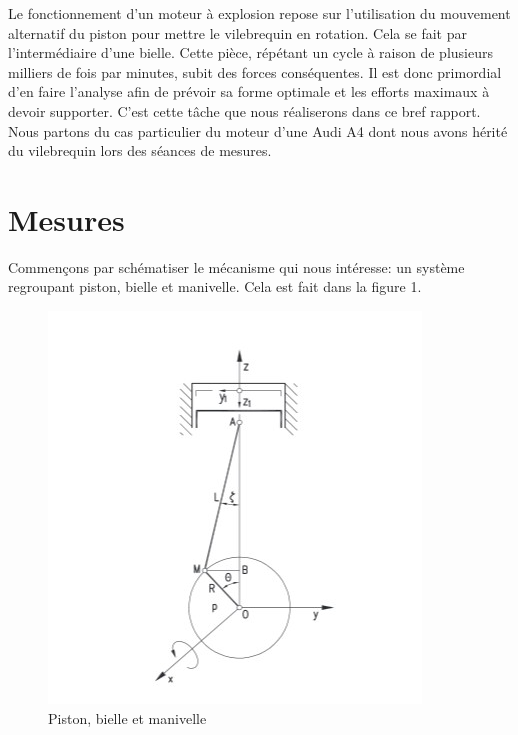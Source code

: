 \documentclass[a4paper,oneside,12pt]{report}
\begin{document}
Le fonctionnement d'un moteur à explosion repose sur l'utilisation du mouvement alternatif du piston pour mettre le vilebrequin en rotation. Cela se fait par l'intermédiaire d'une bielle. Cette pièce, répétant un cycle à raison de plusieurs milliers de fois par minutes, subit des forces conséquentes. Il est donc primordial d'en faire l'analyse afin de prévoir sa forme optimale et les efforts maximaux à devoir supporter. C'est cette tâche que nous réaliserons dans ce bref rapport. Nous partons du cas particulier du moteur d'une Audi A4 dont nous avons hérité du vilebrequin lors des séances de mesures.

\section{Mesures}

Commençons par schématiser le mécanisme qui nous intéresse: un système regroupant piston, bielle et manivelle. Cela est fait dans la figure 1. \\

\begin{figure}	
	\center
	\includegraphics[scale=0.8]{Dessin.jpg}
	\caption{Piston, bielle et manivelle}
\end{figure}
\end{document}
